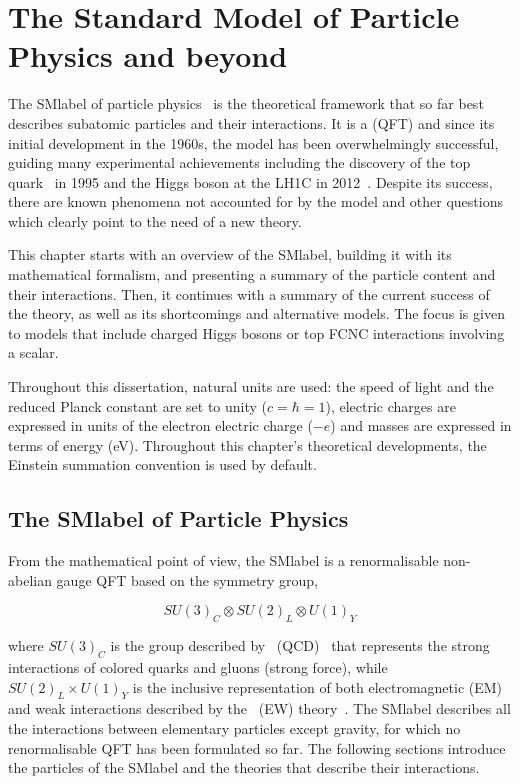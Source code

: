 \chapter{The Standard Model of Particle Physics and beyond}
\label{chapter:SM}

The \acrfull{SMlabel} of particle physics~\cite{PhysRevLett.19.1264,GLASHOW1961579,RevModPhys.52.525} is the theoretical framework
that so far best describes subatomic particles and their interactions.
It is a  (\acrshort{QFT}) and since its initial development in the 1960s,
the model has been overwhelmingly successful, guiding many experimental achievements
including the discovery of the top quark~\cite{topsearch1995,PhysRevLett.74.2626} in 1995
and the Higgs boson at the LH1C in 2012~\cite{ATLASHiggs2012,CMShiggs2012}.
Despite its success, there are known phenomena not accounted for by the model
and other questions which clearly point to the need of a new theory.

This chapter starts with an overview of the \acrshort{SMlabel}, building it with its mathematical formalism, and presenting a summary of the particle content and their interactions. Then, it continues with a summary of the current success of the theory, as well as its shortcomings and alternative models. The focus is given to models that include charged Higgs bosons or top FCNC interactions involving a scalar.

Throughout this dissertation, natural units are used: the speed of light and the reduced Planck constant are set to unity ($c=\hbar=1$),
electric charges are expressed in units of the electron electric charge ($-e$) and masses are expressed in terms of energy (eV).
Throughout this chapter's theoretical developments, the Einstein summation convention is used by default.

\section{The \acrlong{SMlabel} of Particle Physics}

From the mathematical point of view, the \acrshort{SMlabel} is a renormalisable non-abelian gauge \acrshort{QFT} based on the
symmetry group, 

\begin{equation}
    \label{Theory_eq:SMgroup}
    SU(3)_C\otimes SU(2)_L\otimes U(1)_Y
\end{equation}

where $SU(3)_C$ is the group described by ~(\acrshort{QCD})~\cite{QCD} that
represents the strong interactions of colored quarks and gluons (strong force),
while $SU(2)_L\times U(1)_Y$ is the inclusive representation of both electromagnetic (EM) and weak interactions
described by the ~(\acrshort{EW}) theory~\cite{PhysRevLett.19.1264,Salam:1968rm,GLASHOW1961579}. The \acrshort{SMlabel} describes all the interactions between elementary
particles except gravity, for which no renormalisable \acrshort{QFT} has been formulated so far.
The following sections introduce the particles of the \acrshort{SMlabel} and the theories that describe their interactions.  


